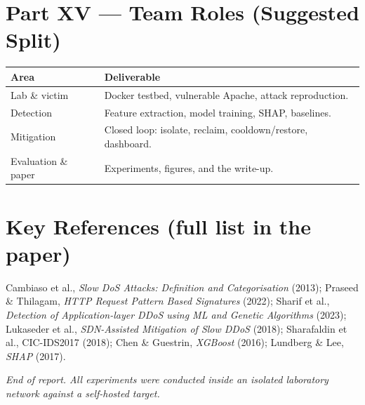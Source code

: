 \documentclass[11pt,a4paper]{article}
\begin{document}
\section{Part XV --- Team Roles (Suggested Split)}
\begin{center}
\begin{tabular}{>{\raggedright}p{} p{}}
\toprule
\textbf{Area} & \textbf{Deliverable} \\
\midrule
Lab \& victim & Docker testbed, vulnerable Apache, attack reproduction. \\
Detection & Feature extraction, model training, SHAP, baselines. \\
Mitigation & Closed loop: isolate, reclaim, cooldown/restore, dashboard. \\
Evaluation \& paper & Experiments, figures, and the write-up. \\
\bottomrule
\end{tabular}
\end{center}

\section*{Key References (full list in the paper)}
Cambiaso et al., \emph{Slow DoS Attacks: Definition and Categorisation} (2013);
Praseed \& Thilagam, \emph{HTTP Request Pattern Based Signatures} (2022);
Sharif et al., \emph{Detection of Application-layer DDoS using ML and Genetic
Algorithms} (2023); Lukaseder et al., \emph{SDN-Assisted Mitigation of Slow DDoS}
(2018); Sharafaldin et al., CIC-IDS2017 (2018); Chen \& Guestrin, \emph{XGBoost}
(2016); Lundberg \& Lee, \emph{SHAP} (2017).

\vfill
\begin{center}\itshape
End of report. All experiments were conducted inside an isolated laboratory
network against a self-hosted target.
\end{center}
\end{document}
